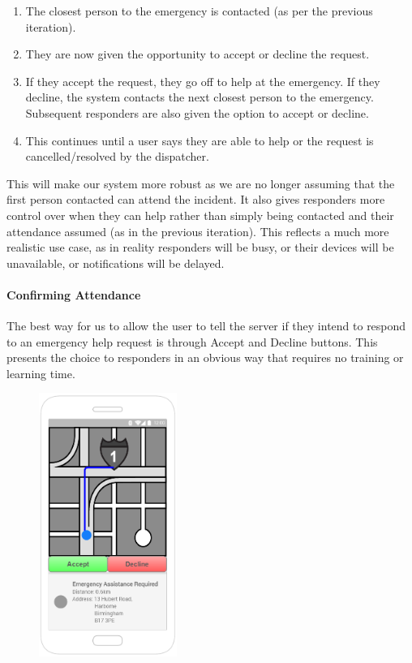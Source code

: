 \documentclass{article}
\begin{document}
	\begin{enumerate}
  		\item The closest person to the emergency is contacted (as per the previous iteration).
  		\item They are now given the opportunity to accept or decline the request.
  		\item If they accept the request, they go off to help at the emergency. If they decline, the system contacts the next closest person to the emergency. Subsequent responders are also given the option to accept or decline.
  		\item This continues until a user says they are able to help or the request is cancelled/resolved by the dispatcher.
	\end{enumerate}
	This will make our system more robust as we are no longer assuming that the first person contacted can attend the incident. It also gives responders more control over when they can help rather than simply being contacted and their attendance assumed (as in the previous iteration). This reflects a much more realistic use case, as in reality responders will be busy, or their devices will be unavailable, or notifications will be delayed.\\
		
		\pagebreak
	\paragraph{Confirming Attendance}
	The best way for us to allow the user to tell the server if they intend to respond to an emergency help request is through  Accept and Decline buttons. This presents the choice to responders in an obvious way that requires no training or learning time.\\
\begin{figure}
  \begin{center}
    \includegraphics[width=0.4\textwidth]{"Iteration2/Iteration 1 - Accept_Decline Buttons 1"}
  \end{center}
\end{figure}
	
\end{document}
